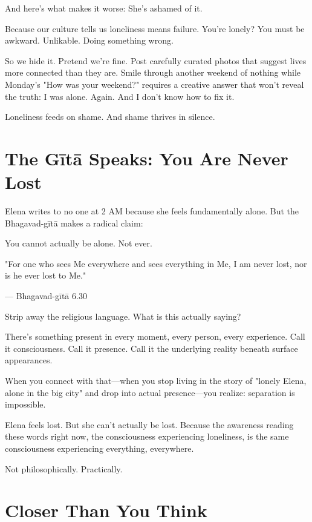 \documentclass[11pt,twoside]{book}
\begin{document}
And here's what makes it worse: She's ashamed of it.

Because our culture tells us loneliness means failure. You're lonely? You must be awkward. Unlikable. Doing something wrong.

So we hide it. Pretend we're fine. Post carefully curated photos that suggest lives more connected than they are. Smile through another weekend of nothing while Monday's "How was your weekend?" requires a creative answer that won't reveal the truth: I was alone. Again. And I don't know how to fix it.

Loneliness feeds on shame. And shame thrives in silence.

\section*{The Gītā Speaks: You Are Never Lost}

Elena writes to no one at 2 AM because she feels fundamentally alone. But the Bhagavad-gītā makes a radical claim:

You cannot actually be alone. Not ever.

\begin{pullquote}
"For one who sees Me everywhere and sees everything in Me, I am never lost, nor is he ever lost to Me."

--- Bhagavad-gītā 6.30
\end{pullquote}

Strip away the religious language. What is this actually saying?

There's something present in every moment, every person, every experience. Call it consciousness. Call it presence. Call it the underlying reality beneath surface appearances.

When you connect with that—when you stop living in the story of "lonely Elena, alone in the big city" and drop into actual presence—you realize: separation is impossible.

Elena feels lost. But she can't actually be lost. Because the awareness reading these words right now, the consciousness experiencing loneliness, is the same consciousness experiencing everything, everywhere.

Not philosophically. Practically.

\section*{Closer Than You Think}
\end{document}
